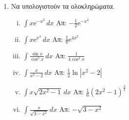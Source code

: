 \documentclass[a4paper,table]{report}
\begin{document}
\begin{enumerate}
  \item Να υπολογιστούν τα ολοκληρώματα.
    \begin{enumerate}[i)]
      \item $ \int x \mathrm{e}^{-x^2} \,{dx} $ \hfill Απ: $ - \frac{1}{2}
        \mathrm{e}^{-x^{2}} $ 
      \item $ \int x \mathrm{e}^{x^4} \,{dx} $ \hfill Απ: $ \frac{1}{8}
        \mathrm{e}^{4x^{2}} $ 
      \item $ \int \frac{\sin{x}}{\cos^{5}{x}}  \,{dx} $ \hfill Απ: $ 
        \frac{1}{4\cos^{4}{x}} $ 
      \item $\int\frac{x}{x^2-2} \, dx$ \hfill Απ: $\frac{1}{2}\ln|x^2-2|$
      \item $ \int x \sqrt{2x^{2}-1} \,{dx} $ 
        \hfill Απ: $ \frac{1}{6} (2x^{2}-1)^{\frac{3}{2}} $  
      \item $\int\frac{x}{\sqrt{3-x^{2}}} \, dx$ \hfill Απ: $ -\sqrt{3-x^{2}} $
    \end{enumerate}

\end{enumerate}
\end{document}
